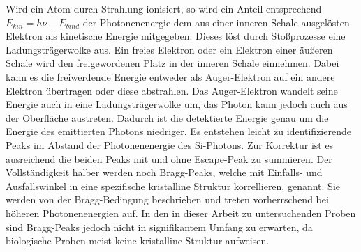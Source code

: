 Wird ein Atom durch Strahlung ionisiert, so wird ein Anteil entsprechend $E_{kin} = h\nu - E_{bind}$ der Photonenenergie dem aus einer inneren Schale ausgelösten Elektron als kinetische Energie mitgegeben. Dieses löst durch Stoßprozesse eine Ladungsträgerwolke aus. Ein freies Elektron oder ein Elektron einer äußeren Schale wird den freigewordenen Platz in der inneren Schale einnehmen. Dabei kann es die freiwerdende Energie entweder als Auger-Elektron auf ein andere Elektron übertragen oder diese abstrahlen. Das Auger-Elektron wandelt seine Energie auch in eine Ladungsträgerwolke um, das Photon kann jedoch auch aus der Oberfläche austreten. Dadurch ist die detektierte Energie genau um die Energie des emittierten Photons niedriger. Es entstehen leicht zu identifizierende Peaks im Abstand der Photonenenergie des Si-Photons. Zur Korrektur ist es ausreichend die beiden Peaks mit und ohne Escape-Peak zu summieren.\newlines
Der Vollständigkeit halber werden noch Bragg-Peaks, welche mit Einfalls- und Ausfallswinkel in eine spezifische kristalline Struktur korrellieren, genannt. Sie werden von der Bragg-Bedingung beschrieben und treten vorherrschend bei höheren Photonenenergien auf. In den in dieser Arbeit zu untersuchenden Proben sind Bragg-Peaks jedoch nicht in signifikantem Umfang zu erwarten, da biologische Proben meist keine kristalline Struktur aufweisen.